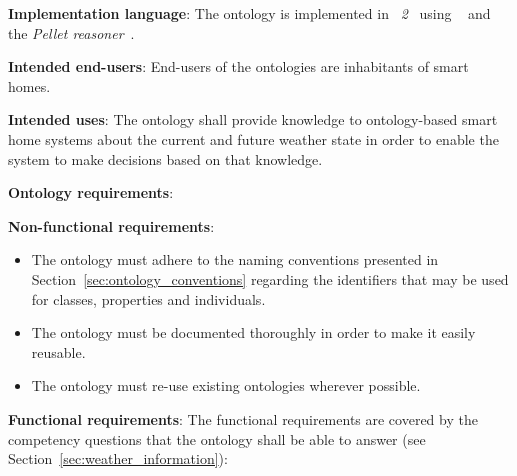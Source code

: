 \begin{mdframed}[linewidth=.6pt]
\vspace{.3cm}

\textbf{Implementation language}: The ontology is implemented in \emph{~2}~\cite{OWL} using \protege~\cite{protege} and the \emph{Pellet reasoner}~\cite{pellet}.

\vspace{.3cm}

\textbf{Intended end-users}: End-users of the ontologies are inhabitants of smart homes. %

\vspace{.3cm}

\textbf{Intended uses}: The ontology shall provide knowledge to ontology-based smart home systems about the current and future weather state in order to enable the system to make decisions based on that knowledge.

\vspace{.3cm}

\textbf{Ontology requirements}:

\vspace{.3cm}

\setlength{\leftskip}{.5cm}

\textbf{Non-functional requirements}:

\begin{itemize}
  \item The ontology must adhere to the naming conventions presented in Section~\ref{sec:ontology_conventions} regarding the identifiers that may be used for classes, properties and individuals.
  \item The ontology must be documented thoroughly in order to make it easily reusable.
  \item The ontology must re-use existing ontologies wherever possible.
\end{itemize}

\textbf{Functional requirements}: The functional requirements are covered by the competency questions that the ontology shall be able to answer (see Section~\ref{sec:weather_information}):


\end{mdframed}
